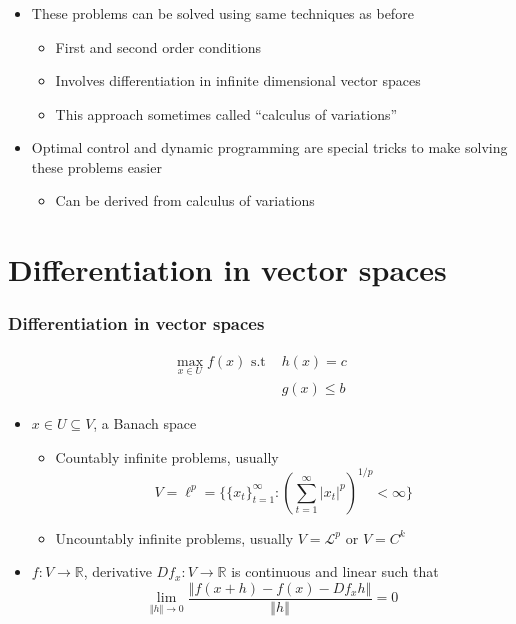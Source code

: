 \documentclass[compress]{beamer}
\def\R{\mathbb{R}}
\newcommand{\norm}[1]{\left\Vert {#1} \right\Vert}
\renewcommand{\to}{{\rightarrow}}
\begin{document}
\begin{frame} \frametitle{}
  \begin{itemize}
  \item These problems can be solved using same techniques as before
    \begin{itemize}
    \item First and second order conditions
    \item Involves differentiation in infinite dimensional vector
      spaces
    \item This approach sometimes called ``calculus of variations''
    \end{itemize}
  \item Optimal control and dynamic programming are special tricks to
    make solving these problems easier
    \begin{itemize}
    \item Can be derived from calculus of variations
    \end{itemize}
  \end{itemize}
\end{frame}

\section{Differentiation in vector spaces}

\begin{frame}\frametitle{Differentiation in vector spaces}
  \begin{align*}
    \max_{x \in U} f(x) \text{ s.t } & h(x) = c \\
    & g(x) \leq b 
  \end{align*}
  \begin{itemize}
  \item $x \in U \subseteq V$, a Banach space
    \begin{itemize}
    \item Countably infinite problems, usually 
      \[ V = \ell^p = \{\{x_t\}_{t=1}^\infty:
      \left(\sum_{t=1}^\infty |x_t|^p\right)^{1/p} < \infty\} \]      
    \item Uncountably infinite problems, usually $V = \mathcal{L}^p$
      or $V = C^k$
    \end{itemize}
  \item $f: V \to \R$, derivative $Df_x: V \to \R$ is continuous and
    linear such that
    \[ \lim_{\norm{h} \to 0} \frac{\norm{f(x+h) - f(x) - Df_x h}}{\norm{h}}
    = 0 \]    
  \end{itemize}
\end{frame}
\end{document}
